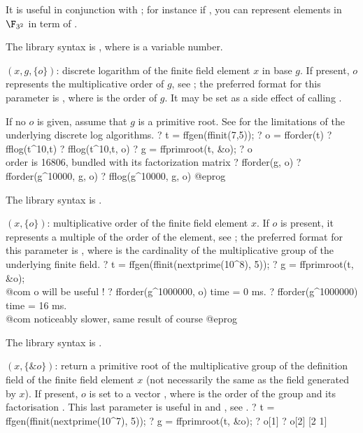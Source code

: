 It is useful in conjunction with ; for instance if , you can represent elements in $\F_{3^2}$ in term of .

The library syntax is , where  is a variable number.

$(x,g,\{o\})$: \label{se:fflog}discrete logarithm of the finite field element $x$ in base $g$. If
present, $o$ represents the multiplicative order of $g$, see
; the preferred format for
this parameter is , where  is the
order of $g$. It may be set as a side effect of calling .

If no $o$ is given, assume that $g$ is a primitive root.
See  for the limitations of the underlying discrete log algorithms.
\bprog
? t = ffgen(ffinit(7,5));
? o = fforder(t)
? fflog(t^10,t)
? fflog(t^10,t, o)
? g = ffprimroot(t, &o);
? o   \\ order is 16806, bundled with its factorization matrix
? fforder(g, o)
? fforder(g^10000, g, o)
? fflog(g^10000, g, o)
@eprog

The library syntax is .

$(x,\{o\})$: \label{se:fforder}multiplicative order of the finite field element $x$.  If $o$ is
present, it represents a multiple of the order of the element,
see ; the preferred format for
this parameter is \kbd{[N, factor(N)]}, where  is the cardinality
of the multiplicative group of the underlying finite field.
\bprog
? t = ffgen(ffinit(nextprime(10^8), 5));
? g = ffprimroot(t, &o);  \\@com o will be useful !
? fforder(g^1000000, o)
time = 0 ms.
? fforder(g^1000000)
time = 16 ms. \\@com noticeably slower, same result of course
@eprog

The library syntax is .

$(x, \{\&o\})$: \label{se:ffprimroot}return a primitive root of the multiplicative
group of the definition field of the finite field element $x$ (not necessarily
the same as the field generated by $x$). If present, $o$ is set to
a vector \kbd{[ord, fa]}, where  is the order of the group
and  its factorisation . This last parameter is
useful in  and , see .
\bprog
? t = ffgen(ffinit(nextprime(10^7), 5));
? g = ffprimroot(t, &o);
? o[1]
? o[2]
[2 1]

